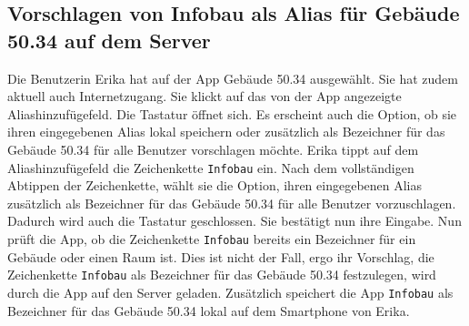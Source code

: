 \subsection{Vorschlagen von Infobau als Alias für Gebäude 50.34 auf dem Server}

Die Benutzerin Erika hat auf der App Gebäude 50.34 ausgewählt. 
Sie hat zudem aktuell auch Internetzugang. 
Sie klickt auf das von der App angezeigte Aliashinzufügefeld. 
Die Tastatur öffnet sich.  
Es erscheint auch die Option, ob sie ihren eingegebenen Alias lokal speichern oder zusätzlich als Bezeichner für das Gebäude 50.34 für alle Benutzer vorschlagen möchte. 
Erika tippt auf dem Aliashinzufügefeld die Zeichenkette \texttt{Infobau} ein.
Nach dem vollständigen Abtippen der Zeichenkette, wählt sie die Option, ihren eingegebenen Alias zusätzlich als Bezeichner für das Gebäude 50.34 für alle Benutzer vorzuschlagen. 
Dadurch wird auch die Tastatur geschlossen. 
Sie bestätigt nun ihre Eingabe. 
Nun prüft die App, ob die Zeichenkette \texttt{Infobau} bereits ein Bezeichner für ein Gebäude oder einen Raum ist. 
Dies ist nicht der Fall, ergo ihr Vorschlag, die Zeichenkette \texttt{Infobau} als Bezeichner für das Gebäude 50.34 festzulegen, wird durch die App auf den Server geladen. 
Zusätzlich speichert die App \texttt{Infobau} als Bezeichner für das Gebäude 50.34 lokal auf dem Smartphone von Erika.